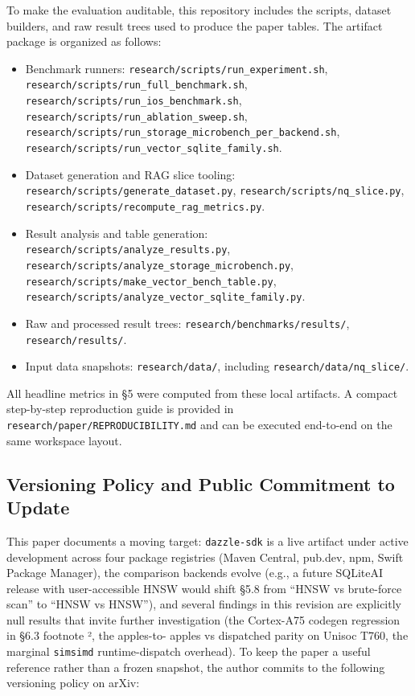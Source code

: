 To make the evaluation auditable, this repository includes the scripts, dataset
builders, and raw result trees used to produce the paper tables. The artifact
package is organized as follows:

\begin{itemize}
\tightlist
\item
  Benchmark runners: \texttt{research/scripts/run\_experiment.sh},
  \texttt{research/scripts/run\_full\_benchmark.sh},
  \texttt{research/scripts/run\_ios\_benchmark.sh},
  \texttt{research/scripts/run\_ablation\_sweep.sh},
  \texttt{research/scripts/run\_storage\_microbench\_per\_backend.sh},
  \texttt{research/scripts/run\_vector\_sqlite\_family.sh}.
\item
  Dataset generation and RAG slice tooling:
  \texttt{research/scripts/generate\_dataset.py},
  \texttt{research/scripts/nq\_slice.py},
  \texttt{research/scripts/recompute\_rag\_metrics.py}.
\item
  Result analysis and table generation:
  \texttt{research/scripts/analyze\_results.py},
  \texttt{research/scripts/analyze\_storage\_microbench.py},
  \texttt{research/scripts/make\_vector\_bench\_table.py},
  \texttt{research/scripts/analyze\_vector\_sqlite\_family.py}.
\item
  Raw and processed result trees: \texttt{research/benchmarks/results/},
  \texttt{research/results/}.
\item
  Input data snapshots: \texttt{research/data/}, including
  \texttt{research/data/nq\_slice/}.
\end{itemize}

All headline metrics in §5 were computed from these local artifacts. A compact
step-by-step reproduction guide is provided in
\texttt{research/paper/REPRODUCIBILITY.md} and can be executed end-to-end on the
same workspace layout.

\subsection{Versioning Policy and Public Commitment to
Update}\label{versioning-policy-and-public-commitment-to-update}

This paper documents a moving target: \texttt{dazzle-sdk} is a live artifact
under active development across four package registries (Maven Central, pub.dev,
npm, Swift Package Manager), the comparison backends evolve (e.g., a future
SQLiteAI release with user-accessible HNSW would shift §5.8 from ``HNSW vs
brute-force scan'' to ``HNSW vs HNSW''), and several findings in this revision
are explicitly null results that invite further investigation (the Cortex-A75
codegen regression in §6.3 footnote ², the apples-to- apples vs dispatched
parity on Unisoc T760, the marginal \texttt{simsimd} runtime-dispatch overhead).
To keep the paper a useful reference rather than a frozen snapshot, the author
commits to the following versioning policy on arXiv:

